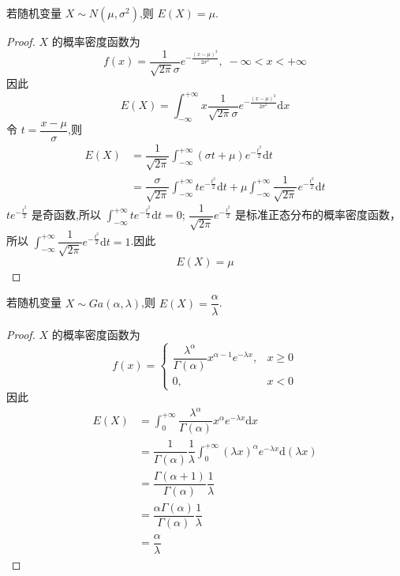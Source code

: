 \begin{conclusion}
    \indent 若随机变量 $X \sim N(\mu,\sigma^2)$,则 $E(X) = \mu$.
\end{conclusion}

\begin{proof}
    $X$ 的概率密度函数为
    $$
    f(x) = \dfrac{1}{\sqrt{2 \pi} \sigma} e^{-\frac{(x-\mu)^2}{2 \sigma^2}}, \; -\infty < x < +\infty
    $$
    因此
    $$
    E(X) = \int_{-\infty}^{+\infty} x \dfrac{1}{\sqrt{2 \pi} \sigma} e^{-\frac{(x-\mu)^2}{2 \sigma^2}} \text{d}x
    $$
    令 $t = \dfrac{x - \mu}{\sigma}$,则
    $$
    \begin{aligned}
        E(X) &= \dfrac{1}{\sqrt{2 \pi}} \int_{-\infty}^{+\infty} (\sigma t + \mu) e^{-\frac{t^2}{2}} \text{d}t \\
        &= \dfrac{\sigma}{\sqrt{2 \pi}} \int_{-\infty}^{+\infty} te^{-\frac{t^2}{2}} \text{d}t + \mu \int_{-\infty}^{+\infty} \dfrac{1}{\sqrt{2 \pi}} e^{-\frac{t^2}{2}} \text{d}t
    \end{aligned}
    $$
    $te^{-\frac{t^2}{2}}$ 是奇函数,所以 $\displaystyle\int_{-\infty}^{+\infty} te^{-\frac{t^2}{2}} \text{d}t = 0$; $\dfrac{1}{\sqrt{2 \pi}} e^{-\frac{t^2}{2}}$ 是标准正态分布的概率密度函数，所以 $\displaystyle\int_{-\infty}^{+\infty} \dfrac{1}{\sqrt{2 \pi}} e^{-\frac{t^2}{2}} \text{d}t = 1$.因此
    $$E(X) = \mu$$
\end{proof}

\begin{conclusion}
    \indent 若随机变量 $X \sim Ga(\alpha,\lambda)$,则 $E(X) = \dfrac{\alpha}{\lambda}$.
\end{conclusion}

\begin{proof}
    $X$ 的概率密度函数为
    $$
    f(x) = \begin{cases}
        \dfrac{\lambda^\alpha}{\Gamma(\alpha)} x^{\alpha - 1} e^{-\lambda x}, & x \geqslant 0 \\[0.5em]
        0, & x<0
    \end{cases}
    $$
    因此
    $$
    \begin{aligned}
        E(X) &= \int_{0}^{+\infty} \dfrac{\lambda^\alpha}{\Gamma(\alpha)} x^\alpha e^{-\lambda x} \text{d}x \\
        &= \dfrac{1}{\Gamma(\alpha)} \dfrac{1}{\lambda} \int_{0}^{+\infty} (\lambda x)^\alpha e^{-\lambda x} \text{d}(\lambda x) \\
        &= \dfrac{\Gamma(\alpha + 1)}{\Gamma(\alpha)} \dfrac{1}{\lambda} \\
        &= \dfrac{\alpha \Gamma(\alpha)}{\Gamma(\alpha)} \dfrac{1}{\lambda} \\
        &= \dfrac{\alpha}{\lambda}
    \end{aligned}
    $$
\end{proof}


